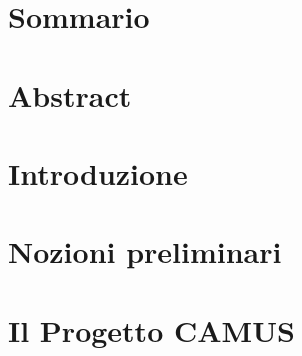 \documentclass[11pt,english,italian,openright]{book}
\begin{document}
\frontmatter
\pagestyle{empty}
\restoregeometry

\cleardoublepage{}

\begin{flushright}
\emph{}\cleardoublepage{}
\par\end{flushright}





\chapter*{Sommario}

\thispagestyle{empty}\cleardoublepage{}


\chapter*{Abstract}

\thispagestyle{empty}\cleardoublepage{}
\setcounter{page}{1}
\pagestyle{fancy}\tableofcontents{}\listoffigures
\listoftables
{}
\renewcommand\lstlistlistingname{Elenco dei listati}
\listoflistings
\cleardoublepage{}\mainmatter
\renewcommand{\sectionmark}[1]{\markright{\thesection.\ #1}}
\renewcommand{\chaptermark}[1]{\markboth{\thechapter.\ #1}{}}


\chapter{Introduzione\label{ch:introduzione}}




\chapter{Nozioni preliminari\label{ch:nozioni-preliminari}}




\chapter{Il Progetto CAMUS\label{ch:camus}}
\end{document}
